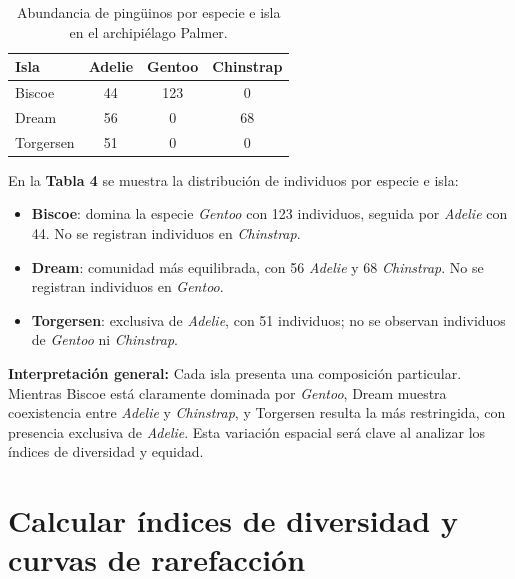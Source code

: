 \documentclass[
  spanish,
  11pt,
  a4paper,
  DIV=11,
  numbers=noendperiod]{scrartcl}
\begin{document}
\begin{longtable}[t]{lccc}
\caption{\label{tab:abundancia}Abundancia de pingüinos por especie e isla 
        en el archipiélago Palmer.}\\
\toprule
Isla & Adelie & Gentoo & Chinstrap\\
\midrule
Biscoe & 44 & 123 & 0\\
Dream & 56 & 0 & 68\\
Torgersen & 51 & 0 & 0\\
\bottomrule
\end{longtable}

En la \textbf{Tabla 4} se muestra la distribución de individuos por
especie e isla:

\begin{itemize}
\item
  \textbf{Biscoe}: domina la especie \emph{Gentoo} con 123 individuos,
  seguida por \emph{Adelie} con 44. No se registran individuos en
  \emph{Chinstrap}.
\item
  \textbf{Dream}: comunidad más equilibrada, con 56 \emph{Adelie} y 68
  \emph{Chinstrap}. No se registran individuos en \emph{Gentoo}.
\item
  \textbf{Torgersen}: exclusiva de \emph{Adelie}, con 51 individuos; no
  se observan individuos de \emph{Gentoo} ni \emph{Chinstrap}.
\end{itemize}

\textbf{Interpretación general:} Cada isla presenta una composición
particular. Mientras Biscoe está claramente dominada por \emph{Gentoo},
Dream muestra coexistencia entre \emph{Adelie} y \emph{Chinstrap}, y
Torgersen resulta la más restringida, con presencia exclusiva de
\emph{Adelie}. Esta variación espacial será clave al analizar los
índices de diversidad y equidad.

\section{Calcular índices de diversidad y curvas de
rarefacción}\label{calcular-uxedndices-de-diversidad-y-curvas-de-rarefacciuxf3n}
\end{document}
